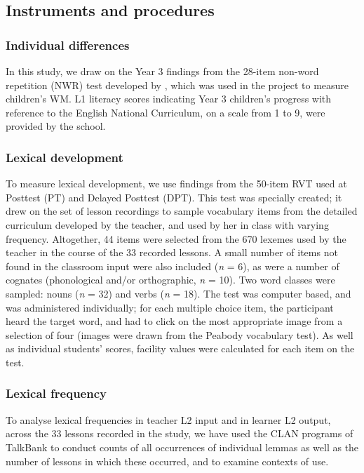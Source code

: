 \documentclass[output=paper]{langscibook}
\begin{document}
\subsection{Instruments and procedures}\largerpage
\subsubsection{Individual differences}

In this study, we draw on the Year 3 findings from the 28-item non-word repetition (NWR) test developed by \citet{GathercoleBaddeley1996}, which was used in the project to measure children’s WM. L1 literacy scores indicating Year 3 children’s progress with reference to the English National Curriculum, on a scale from 1 to 9, were provided by the school.

\subsubsection{Lexical development}

To measure lexical development, we use findings from the 50-item RVT used at Posttest (PT) and Delayed Posttest (DPT). This test was specially created; it drew on the set of lesson recordings to sample vocabulary items from the detailed curriculum developed by the teacher, and used by her in class with varying frequency. Altogether, 44 items were selected from the 670 lexemes used by the teacher in the course of the 33 recorded lessons. A small number of items not found in the classroom input were also included (\textit{n} = 6), as were a number of cognates (phonological and/or orthographic, \textit{n} = 10). Two word classes were sampled: nouns (\textit{n} = 32) and verbs (\textit{n} = 18). The test was computer based, and was administered individually; for each multiple choice item, the participant heard the target word, and had to click on the most appropriate image from a selection of four (images were drawn from the Peabody vocabulary test). As well as individual students’ scores, facility values were calculated for each item on the test.

\subsubsection{Lexical frequency}

To analyse lexical frequencies in teacher L2 input and in learner L2 output, across the 33 lessons recorded in the study, we have used the CLAN programs of TalkBank \citep{MacWhinney2000} to conduct counts of all occurrences of individual lemmas as well as the number of lessons in which these occurred, and to examine contexts of use. 
\end{document}
